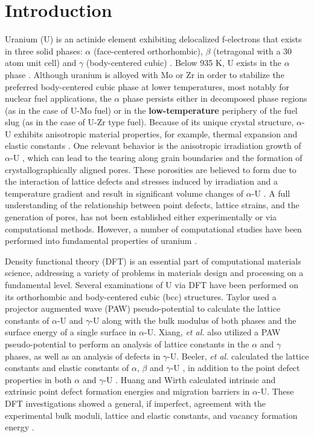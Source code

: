 \documentclass[utf8]{frontiersSCNS} %
\providecommand{\DIFaddtex}[1]{{\bf #1}} %
\providecommand{\DIFdeltex}[1]{} %
\providecommand{\DIFaddbegin}{\protect\color{blue}} %
\providecommand{\DIFaddend}{\protect\color{black}} %
\providecommand{\DIFdelbegin}{\protect\color{red}} %
\providecommand{\DIFdelend}{\protect\color{black}} %
\providecommand{\DIFadd}[1]{\texorpdfstring{\DIFaddtex{#1}}{#1}} %
\providecommand{\DIFdel}[1]{\texorpdfstring{\DIFdeltex{#1}}{}} %
\begin{document}
\section{Introduction}

Uranium (U) is an actinide element exhibiting delocalized f-electrons that exists in three solid phases: $\alpha$ (face-centered orthorhombic), $\beta$ (tetragonal with a 30 atom unit cell) and $\gamma$ (body-centered cubic) \cite{yoo1998}. Below 935 K, U exists in the $\alpha$ phase \cite{soderlind1998}. Although uranium is alloyed with Mo or Zr in order to stabilize the preferred body-centered cubic phase at lower temperatures, most notably for nuclear fuel applications, the $\alpha$ phase persists either in decomposed phase regions (as in the case of U-Mo fuel) \DIFdelbegin \DIFdel{, }\DIFdelend or in the \DIFdelbegin \DIFdel{low temperature }\DIFdelend \DIFaddbegin \DIFadd{low-temperature }\DIFaddend periphery of the fuel slug (as in the case of U-Zr type fuel). Because of its unique crystal structure, $\alpha$-U exhibits anisotropic material properties, for example, thermal expansion \cite{lloyd1966} and elastic constants \cite{fisher1958}. One relevant behavior is the anisotropic irradiation growth of $\alpha$-U \cite{leggett1963}, which can lead to the tearing along grain boundaries and the formation of crystallographically aligned pores. These porosities are believed to form due to the interaction of lattice defects and stresses induced by irradiation and a temperature gradient \DIFdelbegin \DIFdel{, }\DIFdelend and result in significant volume changes of $\alpha$-U \cite{leggett1963,paine1958}. A full understanding of the relationship between point defects, lattice strains, and the generation of pores, has not been established either experimentally or via computational methods. However, a number of computational studies have been performed into fundamental properties of uranium \cite{jokisaari2020}. 

Density functional theory (DFT) is an essential part of computational materials science, addressing a variety of problems in materials design and processing on a fundamental level. Several examinations of U via DFT have been performed on its orthorhombic and body-centered cubic (bcc) structures. Taylor \cite{taylor2008} used a projector augmented wave (PAW) pseudo-potential to calculate the lattice constants of $\alpha$-U and $\gamma$-U along with the bulk modulus of both phases and the surface energy of a single surface in $\alpha$-U. Xiang, \textit{et al.} \cite{xiang2008} also utilized a PAW pseudo-potential to perform an analysis of lattice constants in the $\alpha$ and $\gamma$ phases, as well as an analysis of defects in $\gamma$-U. Beeler, \textit{et al.} calculated the lattice constants and elastic constants of $\alpha$, $\beta$ and $\gamma$-U \cite{beeler2013}, in addition to the point defect properties in both $\alpha$ and $\gamma$-U \cite{beeler2010}. Huang and Wirth \cite{wirth2011, wirth2012} calculated intrinsic and extrinsic point defect formation energies and migration barriers in $\alpha$-U. These DFT investigations showed a general, if imperfect, agreement with the experimental bulk moduli, lattice and elastic constants, and vacancy formation energy \cite{yoo1998, barrett1963, matter1980}. 
\end{document}
